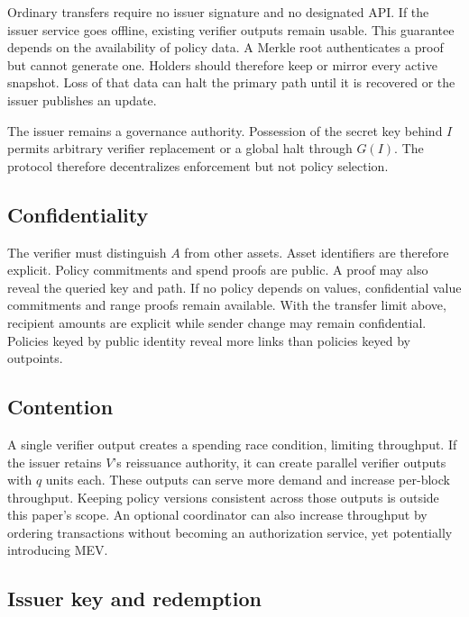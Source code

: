 \documentclass[11pt]{article}
\begin{document}
    Ordinary transfers require no issuer signature and no designated API.
    If the issuer service goes offline, existing verifier outputs remain usable.
    This guarantee depends on the availability of policy data.
    A Merkle root authenticates a proof but cannot generate one.
    Holders should therefore keep or mirror every active snapshot.
    Loss of that data can halt the primary path until it is recovered or the issuer publishes an update.

    The issuer remains a governance authority.
    Possession of the secret key behind $I$ permits arbitrary verifier replacement or a global halt through $G(I)$.
    The protocol therefore decentralizes enforcement but not policy selection.

    \subsection{Confidentiality}

    The verifier must distinguish $A$ from other assets.
    Asset identifiers are therefore explicit.
    Policy commitments and spend proofs are public.
    A proof may also reveal the queried key and path.
    If no policy depends on values, confidential value commitments and range proofs remain available.
    With the transfer limit above, recipient amounts are explicit while sender change may remain confidential.
    Policies keyed by public identity reveal more links than policies keyed by outpoints.

    \subsection{Contention}

    A single verifier output creates a spending race condition, limiting throughput.
    If the issuer retains $V$'s reissuance authority, it can create parallel verifier outputs with $q$ units each.
    These outputs can serve more demand and increase per-block throughput.
    Keeping policy versions consistent across those outputs is outside this paper's scope.
    An optional coordinator can also increase throughput by ordering transactions without becoming an authorization service, yet potentially introducing MEV.

    \subsection{Issuer key and redemption}
\end{document}

